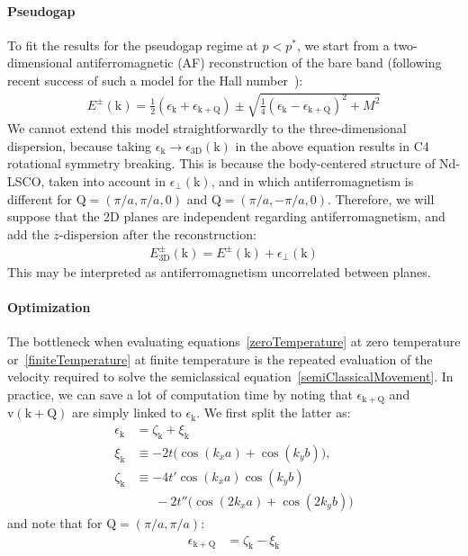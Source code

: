 \documentclass[aps,twocolumn,showpacs,nofootinbib]{revtex4-1}
\renewcommand{\vec}[1]{\bm{\mathrm{#1}}}
\begin{document}
\paragraph*{Pseudogap} 
To fit the results for the pseudogap regime at $p<p^*$, we start from a two-dimensional antiferromagnetic (AF) reconstruction of the bare band (following recent success of such a model for the Hall number~\cite{storey_hall_2016,verret_phenomenological_2017}):
\begin{align}
E^{\pm}(\vec k) 
= 
\tfrac{1}{2}(\epsilon_{\vec k}+\epsilon_{\vec k+\vec Q})
\pm \sqrt{
\tfrac{1}{4}(\epsilon_{\vec k}-\epsilon_{\vec k+\vec Q})^2 + M^2}
\end{align}
We cannot extend this model straightforwardly to the three-dimensional dispersion, because taking $\epsilon_{\vec k}\rightarrow\epsilon_{\text{3D}}(\vec k)$ in the above equation results in C4 rotational symmetry breaking. This is because the body-centered structure of Nd-LSCO, taken into account in $\epsilon_\perp(\vec k)$, and in which antiferromagnetism is different for $\vec Q=(\pi/a,\pi/a,0)$ and $\vec Q=(\pi/a,-\pi/a,0)$. Therefore, we will suppose that the 2D planes are independent regarding antiferromagnetism, and add the $z$-dispersion after the reconstruction:  
\begin{align}
E^{\pm}_{\text{3D}}(\vec k)=E^{\pm}(\vec k)+\epsilon_{\perp}(\vec k)
\end{align}
This may be interpreted as antiferromagnetism uncorrelated between planes.

\paragraph*{Optimization} The bottleneck when evaluating equations~\eqref{zeroTemperature} at zero temperature or~\eqref{finiteTemperature} at finite temperature is the repeated evaluation of the velocity required to solve the semiclassical equation~\eqref{semiClassicalMovement}. In practice, we can save a lot of computation time by noting that $\epsilon_{\vec k+\vec Q}$ and $\vec v(\vec k+\vec Q)$ are simply linked to $\epsilon_{\vec k}$. We first split the latter as:
\begin{align}
\epsilon_{\vec k} &= \zeta_{\vec k} + \xi_{\vec k}
\\
\xi_{\vec k}
&\equiv
-2t\big(\cos (k_xa) + \cos (k_yb)\big),
\\
\zeta_{\vec k} 
&\equiv
-4t'\cos (k_xa)\cos (k_yb)
\nonumber \\
&\phantom{=\ }
-2t''\big(\cos (2k_xa)+\cos (2k_yb)\big)
\end{align}
and note that for $\vec Q=(\pi/a,\pi/a)$:
\begin{align}
\epsilon_{\vec k+\vec Q} &= \zeta_{\vec k} - \xi_{\vec k}
\end{align}
\end{document}
